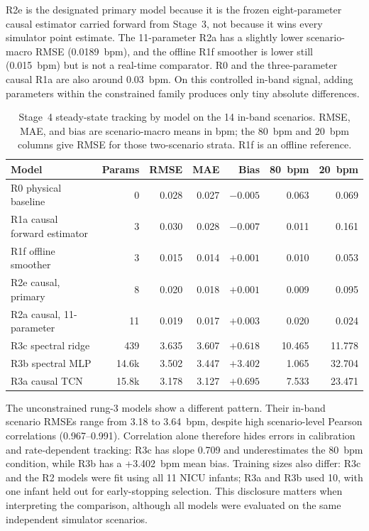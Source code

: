 R2e is the designated primary model because it is the frozen eight-parameter causal estimator carried forward from Stage~3, not because it wins every simulator point estimate. The 11-parameter R2a has a slightly lower scenario-macro RMSE (0.0189~bpm), and the offline R1f smoother is lower still (0.015~bpm) but is not a real-time comparator. R0 and the three-parameter causal R1a are also around 0.03~bpm. On this controlled in-band signal, adding parameters within the constrained family produces only tiny absolute differences.

\begin{table}[htbp]
\centering
\footnotesize
\setlength{\tabcolsep}{4pt}
\caption{Stage~4 steady-state tracking by model on the 14 in-band scenarios. RMSE, MAE, and bias are scenario-macro means in bpm; the 80~bpm and 20~bpm columns give RMSE for those two-scenario strata. R1f is an offline reference.}
\label{tab:ch6_model_transfer}
\begin{tabularx}{\textwidth}{@{}>{\raggedright\arraybackslash}Xrrrrrr@{}}
\toprule
Model & Params & RMSE & MAE & Bias & 80~bpm & 20~bpm \\
\midrule
R0 physical baseline & 0 & 0.028 & 0.027 & $-0.005$ & 0.063 & 0.069 \\
R1a causal forward estimator & 3 & 0.030 & 0.028 & $-0.007$ & 0.011 & 0.161 \\
R1f offline smoother & 3 & 0.015 & 0.014 & $+0.001$ & 0.010 & 0.053 \\
R2e causal, primary & 8 & 0.020 & 0.018 & $+0.001$ & 0.009 & 0.095 \\
R2a causal, 11-parameter & 11 & 0.019 & 0.017 & $+0.003$ & 0.020 & 0.024 \\
R3c spectral ridge & 439 & 3.635 & 3.607 & $+0.618$ & 10.465 & 11.778 \\
R3b spectral MLP & 14.6k & 3.502 & 3.447 & $+3.402$ & 1.065 & 32.704 \\
R3a causal TCN & 15.8k & 3.178 & 3.127 & $+0.695$ & 7.533 & 23.471 \\
\bottomrule
\end{tabularx}
\end{table}

The unconstrained rung-3 models show a different pattern. Their in-band scenario RMSEs range from 3.18 to 3.64~bpm, despite high scenario-level Pearson correlations (0.967--0.991). Correlation alone therefore hides errors in calibration and rate-dependent tracking: R3c has slope 0.709 and underestimates the 80~bpm condition, while R3b has a +3.402~bpm mean bias. Training sizes also differ: R3c and the R2 models were fit using all 11 NICU infants; R3a and R3b used 10, with one infant held out for early-stopping selection. This disclosure matters when interpreting the comparison, although all models were evaluated on the same independent simulator scenarios.

